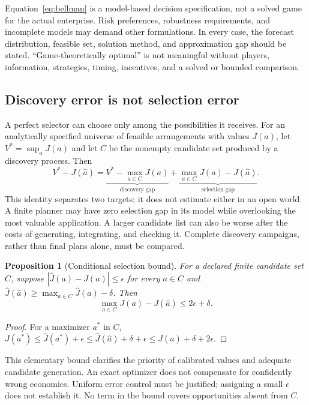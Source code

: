 \documentclass[11pt,letterpaper]{article}
\newtheorem{proposition}{Proposition}[section]
\theoremstyle{remark}\newtheorem{remark}{Remark}[section]
\begin{document}
Equation~\eqref{eq:bellman} is a model-based decision specification, not a solved game for the actual enterprise. Risk preferences, robustness requirements, and incomplete models may demand other formulations. In every case, the forecast distribution, feasible set, solution method, and approximation gap should be stated. ``Game-theoretically optimal'' is not meaningful without players, information, strategies, timing, incentives, and a solved or bounded comparison.

\subsection{Discovery error is not selection error}
A perfect selector can choose only among the possibilities it receives. For an analytically specified universe of feasible arrangements with values $J(a)$, let $V^*=\sup_a J(a)$ and let $C$ be the nonempty candidate set produced by a discovery process. Then
\begin{equation}
V^*-J(\hat a)=
\underbrace{V^*-\max_{a\in C}J(a)}_{\text{discovery gap}}+
\underbrace{\max_{a\in C}J(a)-J(\hat a)}_{\text{selection gap}}.
\label{eq:gaps}
\end{equation}
This identity separates two targets; it does not estimate either in an open world. A finite planner may have zero selection gap in its model while overlooking the most valuable application. A larger candidate list can also be worse after the costs of generating, integrating, and checking it. Complete discovery campaigns, rather than final plans alone, must be compared.

\begin{proposition}[Conditional selection bound]
For a declared finite candidate set $C$, suppose $|\hat J(a)-J(a)|\leq\epsilon$ for every $a\in C$ and $\hat J(\hat a)\geq\max_{a\in C}\hat J(a)-\delta$. Then
\begin{equation}
\max_{a\in C}J(a)-J(\hat a)\leq 2\epsilon+\delta.
\label{eq:selection}
\end{equation}
\end{proposition}
\begin{proof}
For a maximizer $a^*$ in $C$, $J(a^*)\leq\hat J(a^*)+\epsilon\leq\hat J(\hat a)+\delta+\epsilon\leq J(\hat a)+\delta+2\epsilon$.
\end{proof}
This elementary bound clarifies the priority of calibrated values and adequate candidate generation. An exact optimizer does not compensate for confidently wrong economics. Uniform error control must be justified; assigning a small $\epsilon$ does not establish it. No term in the bound covers opportunities absent from $C$.
\end{document}
